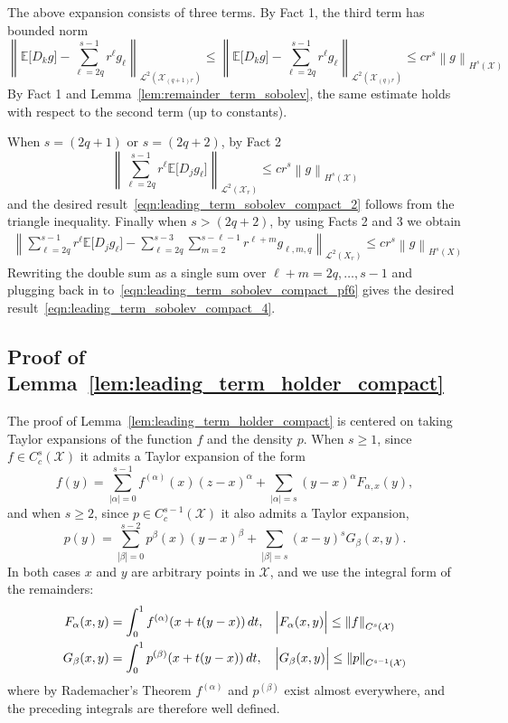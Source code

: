 \documentclass{article}
\newcommand{\abs}[1]{\left \lvert #1 \right \rvert}
\newcommand{\norm}[1]{\left \lVert #1 \right \rVert}
\newcommand{\1}{\mathbf{1}}
\newcommand{\Xset}{\mathcal{X}}
\newcommand{\Leb}{\mathcal{L}}
\newcommand{\Ebb}{\mathbb{E}}
\theoremstyle{alden}
\theoremstyle{aldenthm}
\theoremstyle{definition}
\theoremstyle{remark}
\begin{document}
The above expansion consists of three terms. By Fact 1, the third term has bounded norm
\begin{equation*}
\norm{\Ebb\bigl[D_kg\bigr] - \sum_{\ell = 2q}^{s - 1}r^{\ell} g_{\ell}}_{\Leb^2(\Xset_{(q + 1)r})} \leq \norm{\Ebb\bigl[D_kg\bigr] - \sum_{\ell = 2q}^{s - 1}r^{\ell} g_{\ell}}_{\Leb^2(\Xset_{(q)r})} \leq c r^{s} \norm{g}_{H^s(\Xset)}
\end{equation*}
By Fact 1 and Lemma~\ref{lem:remainder_term_sobolev}, the same estimate holds with respect to the second term (up to constants). 

When $s = (2q + 1)$ or $s = (2q + 2)$, by Fact 2
\begin{equation*}
\norm{ \sum_{\ell = 2q}^{s - 1} r^{\ell} \Ebb\bigl[D_jg_{\ell}\bigr]}_{\Leb^2(\Xset_r)} \leq c r^s \norm{g}_{H^s(\Xset)}
\end{equation*}
and the desired result~\eqref{eqn:leading_term_sobolev_compact_2} follows from the triangle inequality. Finally when $s > (2q + 2)$, by using Facts 2 and 3 we obtain
\begin{align*}
\norm{\sum_{\ell = 2q}^{s - 1} r^{\ell} \Ebb\bigl[D_jg_{\ell}\bigr] - \sum_{\ell = 2q}^{s - 3} \sum_{m = 2}^{s - \ell - 1} r^{\ell + m} g_{\ell,m,q}}_{\Leb^2(X_r)} \leq cr^s \norm{g}_{H^s(X)}
\end{align*}
Rewriting the double sum as a single sum over $\ell + m = 2q,\ldots,s - 1$ and plugging back in to~\eqref{eqn:leading_term_sobolev_compact_pf6} gives the desired result~\eqref{eqn:leading_term_sobolev_compact_4}.

\subsection{Proof of Lemma~\ref{lem:leading_term_holder_compact}}

The proof of Lemma~\ref{lem:leading_term_holder_compact} is centered on taking Taylor expansions of the function $f$ and the density $p$. When $s \geq 1$, since $f \in C_c^s(\Xset)$ it admits a Taylor expansion of the form
\begin{equation*}
f(y) =  \sum_{\abs{\alpha} = 0}^{s - 1} f^{(\alpha)}(x) (z - x)^{\alpha} + \sum_{\abs{\alpha} = s} (y - x)^{\alpha} F_{\alpha,x}(y),
\end{equation*}
and when $s \geq 2$, since $p \in C_c^{s - 1}(\Xset)$ it also admits a Taylor expansion,
\begin{equation*}
p(y) = \sum_{\abs{\beta} = 0}^{s - 2} p^{\beta}(x) (y - x)^{\beta} + \sum_{\abs{\beta} = s} (x - y)^s G_{\beta}(x,y).
\end{equation*}
In both cases $x$ and $y$ are arbitrary points in $\Xset$, and we use the integral form of the remainders:
\begin{align*}
F_{\alpha}(x,y) & = \int_{0}^{1} f^{(\alpha)}(x + t(y - x)) \,dt, && \Bigl|F_{\alpha}(x,y)\Bigr| \leq \norm{f}_{C^s(\Xset)} \\
G_{\beta}(x,y) & = \int_{0}^{1} p^{(\beta)}(x + t(y - x)) \,dt, && \Bigl|G_{\beta}(x,y)\Bigr| \leq \norm{p}_{C^{s - 1}(\Xset)}
\end{align*}
where by Rademacher's Theorem $f^{(\alpha)}$ and $p^{(\beta)}$ exist almost everywhere, and the preceding integrals are therefore well defined.
\end{document}
